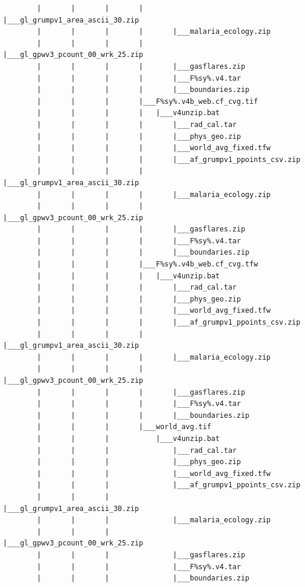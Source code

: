 \documentclass[]{book}
\begin{document}
\begin{verbatim}
        |       |       |       |       |___gl_grumpv1_area_ascii_30.zip
        |       |       |       |       |___malaria_ecology.zip
        |       |       |       |       |___gl_gpwv3_pcount_00_wrk_25.zip
        |       |       |       |       |___gasflares.zip
        |       |       |       |       |___F%sy%.v4.tar
        |       |       |       |       |___boundaries.zip
        |       |       |       |___F%sy%.v4b_web.cf_cvg.tif
        |       |       |       |   |___v4unzip.bat
        |       |       |       |       |___rad_cal.tar
        |       |       |       |       |___phys_geo.zip
        |       |       |       |       |___world_avg_fixed.tfw
        |       |       |       |       |___af_grumpv1_ppoints_csv.zip
        |       |       |       |       |___gl_grumpv1_area_ascii_30.zip
        |       |       |       |       |___malaria_ecology.zip
        |       |       |       |       |___gl_gpwv3_pcount_00_wrk_25.zip
        |       |       |       |       |___gasflares.zip
        |       |       |       |       |___F%sy%.v4.tar
        |       |       |       |       |___boundaries.zip
        |       |       |       |___F%sy%.v4b_web.cf_cvg.tfw
        |       |       |       |   |___v4unzip.bat
        |       |       |       |       |___rad_cal.tar
        |       |       |       |       |___phys_geo.zip
        |       |       |       |       |___world_avg_fixed.tfw
        |       |       |       |       |___af_grumpv1_ppoints_csv.zip
        |       |       |       |       |___gl_grumpv1_area_ascii_30.zip
        |       |       |       |       |___malaria_ecology.zip
        |       |       |       |       |___gl_gpwv3_pcount_00_wrk_25.zip
        |       |       |       |       |___gasflares.zip
        |       |       |       |       |___F%sy%.v4.tar
        |       |       |       |       |___boundaries.zip
        |       |       |       |___world_avg.tif
        |       |       |           |___v4unzip.bat
        |       |       |               |___rad_cal.tar
        |       |       |               |___phys_geo.zip
        |       |       |               |___world_avg_fixed.tfw
        |       |       |               |___af_grumpv1_ppoints_csv.zip
        |       |       |               |___gl_grumpv1_area_ascii_30.zip
        |       |       |               |___malaria_ecology.zip
        |       |       |               |___gl_gpwv3_pcount_00_wrk_25.zip
        |       |       |               |___gasflares.zip
        |       |       |               |___F%sy%.v4.tar
        |       |       |               |___boundaries.zip

\end{verbatim}
\end{document}
